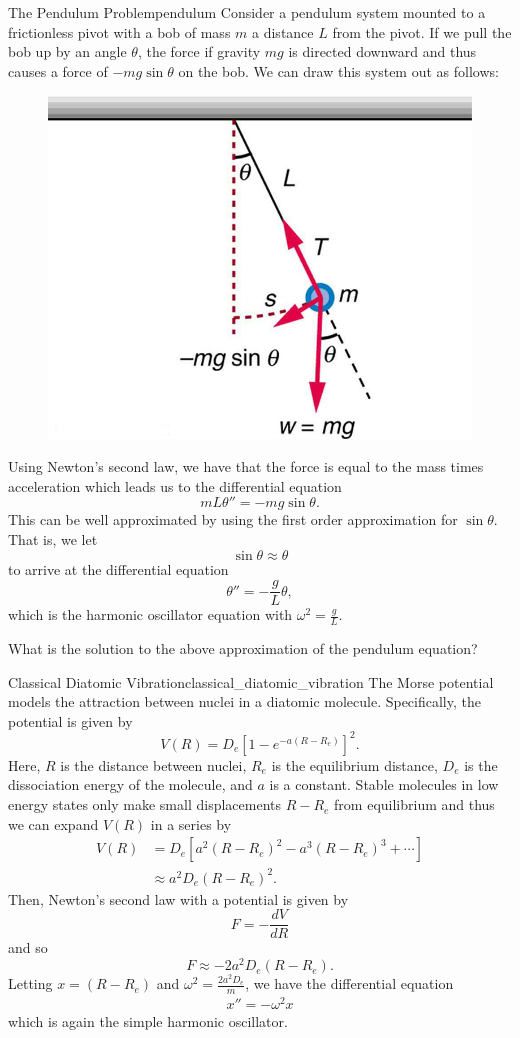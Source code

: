 \begin{ex}{The Pendulum Problem}{pendulum}
Consider a pendulum system mounted to a frictionless pivot with a bob of mass $m$ a distance $L$ from the pivot. If we pull the bob up by an angle $\theta$, the force if gravity $mg$ is directed downward and thus causes a force of $-mg\sin\theta$ on the bob.  We can draw this system out as follows:
\begin{figure}[H]
    \centering
    \includegraphics[width=.5\textwidth]{Figures_Part_3/pendulum.jpg}
\end{figure}
Using Newton's second law, we have that the force is equal to the mass times acceleration which leads us to the differential equation
\[
mL\theta'' = -mg\sin \theta.
\]
This can be well approximated by using the first order approximation for $\sin \theta$. That is, we let
\[
\sin \theta \approx \theta
\]
to arrive at the differential equation
\[
\theta '' = -\frac{g}{L} \theta,
\]
which is the harmonic oscillator equation with $\omega^2 = \frac{g}{L}$.
\end{ex}

\begin{exercise}
What is the solution to the above approximation of the pendulum equation?
\end{exercise}

\begin{ex}{Classical Diatomic Vibration}{classical_diatomic_vibration}
The Morse potential models the attraction between nuclei in a diatomic molecule.  Specifically, the potential is given by
\[
V(R)=D_e \left[ 1- e^{-a(R-R_e)}\right]^2.
\]
Here, $R$ is the distance between nuclei, $R_e$ is the equilibrium distance, $D_e$ is the dissociation energy of the molecule, and $a$ is a constant.  Stable molecules in low energy states only make small displacements $R-R_e$ from equilibrium and thus we can expand $V(R)$ in a series by
\begin{align*}
V(R) &= D_e\left[ a^2(R-R_e)^2-a^3(R-R_e)^3+\cdots \right]\\
&\approx a^2 D_e(R-R_e)^2.
\end{align*}
Then, Newton's second law with a potential is given by
\[
F= - \frac{dV}{dR}
\]
and so
\[
F\approx -2a^2 D_e(R-R_e).
\]
Letting $x=(R-R_e)$ and $\omega^2 = \frac{2a^2D_e}{m}$, we have the differential equation
\begin{align*}
    x'' = -\omega^2 x
\end{align*}
which is again the simple harmonic oscillator.
\end{ex}

